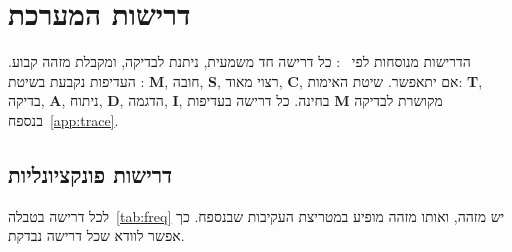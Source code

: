 \chapter{דרישות המערכת}\label{ch:req}

הדרישות מנוסחות לפי ~\cite{iso29148}: כל דרישה חד משמעית, ניתנת לבדיקה, ומקבלת מזהה קבוע. העדיפות נקבעת בשיטת : \textbf{M}, חובה, \textbf{S}, רצוי מאוד, \textbf{C}, אם יתאפשר. שיטת האימות: \textbf{T}, בדיקה, \textbf{A}, ניתוח, \textbf{D}, הדגמה, \textbf{I}, בחינה. כל דרישה בעדיפות \textbf{M} מקושרת לבדיקה בנספח~\ref{app:trace}.

\section{דרישות פונקציונליות}
\small

לכל דרישה בטבלה~\ref{tab:freq} יש מזהה, ואותו מזהה מופיע במטריצת העקיבות שבנספח. כך אפשר לוודא שכל דרישה נבדקת.

